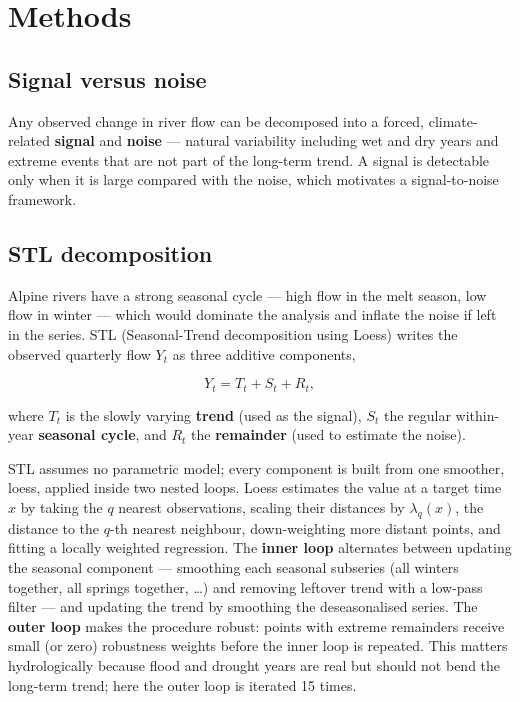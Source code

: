 \documentclass[
]{krantz}
\begin{document}
\section{Methods}\label{methods-1}

\subsection{Signal versus noise}\label{signal-versus-noise}

Any observed change in river flow can be decomposed into a forced, climate-related \textbf{signal} and \textbf{noise} --- natural variability including wet and dry years and extreme events that are not part of the long-term trend. A signal is detectable only when it is large compared with the noise, which motivates a signal-to-noise framework.

\subsection{STL decomposition}\label{stl-decomposition}

Alpine rivers have a strong seasonal cycle --- high flow in the melt season, low flow in winter --- which would dominate the analysis and inflate the noise if left in the series. STL (Seasonal-Trend decomposition using Loess) \citep{cleveland1990} writes the observed quarterly flow \(Y_t\) as three additive components,

\[
Y_t = T_t + S_t + R_t,
\]

where \(T_t\) is the slowly varying \textbf{trend} (used as the signal), \(S_t\) the regular within-year \textbf{seasonal cycle}, and \(R_t\) the \textbf{remainder} (used to estimate the noise).

STL assumes no parametric model; every component is built from one smoother, loess, applied inside two nested loops. Loess estimates the value at a target time \(x\) by taking the \(q\) nearest observations, scaling their distances by \(\lambda_q(x)\), the distance to the \(q\)-th nearest neighbour, down-weighting more distant points, and fitting a locally weighted regression. The \textbf{inner loop} alternates between updating the seasonal component --- smoothing each seasonal subseries (all winters together, all springs together, \ldots) and removing leftover trend with a low-pass filter --- and updating the trend by smoothing the deseasonalised series. The \textbf{outer loop} makes the procedure robust: points with extreme remainders receive small (or zero) robustness weights before the inner loop is repeated. This matters hydrologically because flood and drought years are real but should not bend the long-term trend; here the outer loop is iterated 15 times.
\end{document}
